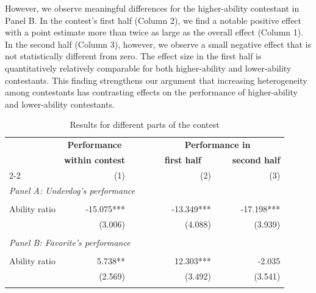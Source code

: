 \documentclass[11pt,a4paper]{article}
\begin{document}
However, we observe meaningful differences for the higher-ability contestant in Panel B. In the contest's first half (Column 2), we find a notable positive effect with a point estimate more than twice as large as the overall effect (Column 1). In the second half (Column 3), however, we observe a small negative effect that is not statistically different from zero. The effect size in the first half is quantitatively relatively comparable for both higher-ability and lower-ability contestants. This finding strengthens our argument that increasing heterogeneity among contestants has contrasting effects on the performance of higher-ability and lower-ability contestants.\par

\begin{table}[H]
		\centering
		\caption{Results for different parts of the contest} 
		\label{tab:table_base_1}
		\begin{tabular}{l r r r r r } 
			\toprule
			\toprule
			& \multicolumn{1}{c}{\textbf{Performance}} & ~~~ &  \multicolumn{3}{c}{\textbf{Performance in }} \\
   			& \multicolumn{1}{c}{\textbf{within contest}} & ~~~ &  \multicolumn{1}{c}{\textbf{~~first half~~}} & ~ & \multicolumn{1}{c}{\textbf{second half}} \\
            \cline{2-2} \cline{4-6} \rule{0pt}{3ex}   
			        & (1)        & ~ & (2)   & ~ & (3)     \\ 


			\midrule
   			\multicolumn{6}{l}{\textit{Panel A: Underdog's performance}}  \\
            \rule{0pt}{0.01ex}\\
			Ability ratio            & -15.075*** & & -13.349*** & & -17.198***  \\
			                         & (3.006)    & & (4.088)    & & (3.939)     \\
            \rule{0pt}{0.3ex}\\
			\multicolumn{6}{l}{\textit{Panel B: Favorite's performance}}      \\
            \rule{0pt}{0.01ex}\\
			Ability ratio            & 5.738**   & & 12.303***   & & -2.035   \\
			                         & (2.569)   & & (3.492)     & & (3.541)  \\
            \rule{0pt}{0.3ex}\\


\end{tabular}
\end{table}
\end{document}
